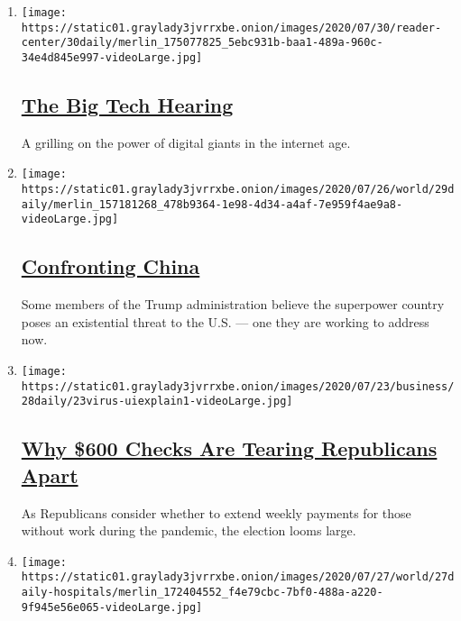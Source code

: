 \begin{enumerate}
\def\labelenumi{\arabic{enumi}.}
\item
  \texttt{[image: https://static01.graylady3jvrrxbe.onion/images/2020/07/30/reader-center/30daily/merlin\_175077825\_5ebc931b-baa1-489a-960c-34e4d845e997-videoLarge.jpg]}

  \hypertarget{the-big-tech-hearing}{%
  \subsection{\texorpdfstring{\href{/2020/07/30/podcasts/the-daily/congress-facebook-amazon-google-apple.html}{The
  Big Tech Hearing}}{The Big Tech Hearing}}\label{the-big-tech-hearing}}

  A grilling on the power of digital giants in the internet age.
\item
  \texttt{[image: https://static01.graylady3jvrrxbe.onion/images/2020/07/26/world/29daily/merlin\_157181268\_478b9364-1e98-4d34-a4af-7e959f4ae9a8-videoLarge.jpg]}

  \hypertarget{confronting-china}{%
  \subsection{\texorpdfstring{\href{/2020/07/29/podcasts/the-daily/china-trump-foreign-policy.html}{Confronting
  China}}{Confronting China}}\label{confronting-china}}

  Some members of the Trump administration believe the superpower
  country poses an existential threat to the U.S. --- one they are
  working to address now.
\item
  \texttt{[image: https://static01.graylady3jvrrxbe.onion/images/2020/07/23/business/28daily/23virus-uiexplain1-videoLarge.jpg]}

  \hypertarget{why-600-checks-are-tearing-republicans-apart}{%
  \subsection{\texorpdfstring{\href{/2020/07/28/podcasts/the-daily/unemployment-benefits-coronavirus.html}{Why
  \$600 Checks Are Tearing Republicans
  Apart}}{Why \$600 Checks Are Tearing Republicans Apart}}\label{why-600-checks-are-tearing-republicans-apart}}

  As Republicans consider whether to extend weekly payments for those
  without work during the pandemic, the election looms large.
\item
  \texttt{[image: https://static01.graylady3jvrrxbe.onion/images/2020/07/27/world/27daily-hospitals/merlin\_172404552\_f4e79cbc-7bf0-488a-a220-9f945e56e065-videoLarge.jpg]}


\end{enumerate}
